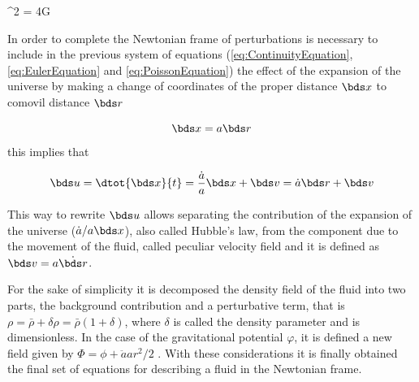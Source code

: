 { \nabla^2 \varphi = 4\pi G \rho }


In order to complete the Newtonian frame of perturbations is necessary to 
include in the previous system of equations (\ref{eq:ContinuityEquation}, 
\ref{eq:EulerEquation} and \ref{eq:PoissonEquation}) the effect of the 
expansion of the universe by making a change of coordinates of the proper
distance $\bds x$ to comovil distance $\bds r$


\[\bds x = a \bds r\]
this implies that



\[\bds u = \dtot{\bds x}{t} = 
\frac{\dot a}{a}\bds x + \bds v = \dot a \bds r + \bds v\]


This way to rewrite $\bds u$ allows separating the contribution of the 
expansion of the universe ($\dot a/a \bds x$), also called Hubble's law,
from the component due to the movement of the fluid, called peculiar 
velocity field and it is defined as $\bds v = a \dot{ \bds r}$.


For the sake of simplicity it is decomposed the density field of the fluid 
into two parts, the background contribution and a perturbative term, that 
is $\rho = \bar \rho + \delta\rho = \bar \rho( 1+ \delta )$, where $\delta$
is called the density parameter and is dimensionless. In the case of the 
gravitational potential $\varphi$, it is defined a new field given by 
$ \Phi = \phi + \ddot a a r^2/2$ \cite{longair2008}. With these 
considerations it is finally obtained the final set of equations for 
describing a fluid in the Newtonian frame.


